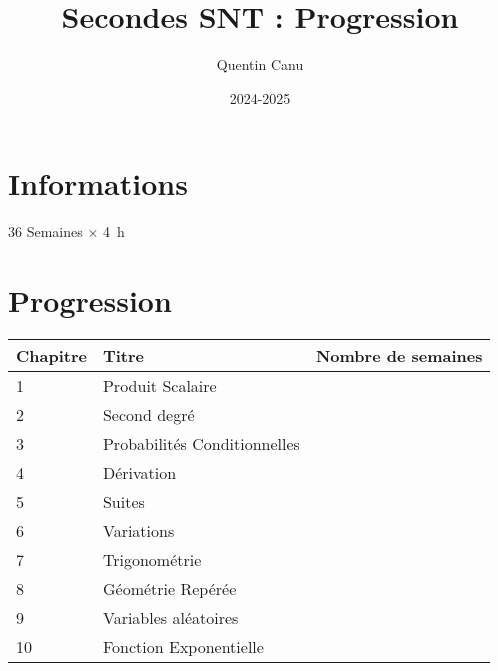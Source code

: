 \documentclass{article}
\title{Secondes SNT : Progression}
\author{Quentin Canu}
\date{2024-2025}
\begin{document}
\maketitle

\section{Informations}

36 Semaines $\times$ \qty{4}{\hour}

\section{Progression}

\begin{center}
    
\begin{tabular}{|l|p{4cm}|p{2cm}|}
\hline
Chapitre
    & 
Titre
        & 
Nombre de semaines\\
\hline
1   &
Produit Scalaire
        &
\\
\hline
2   &
Second degré
        &
\\
\hline
3   &
Probabilités Conditionnelles
        &
\\
\hline
4   &
Dérivation
        &
\\
\hline
5   &
Suites
        &
\\
\hline
6   &
Variations
        &
\\
\hline
7   &
Trigonométrie
        &
\\
\hline
8   &
Géométrie Repérée
        &
\\
\hline
9   &
Variables aléatoires
        &
\\
\hline
10  &
Fonction Exponentielle
        &
\\
\hline
\end{tabular}
\end{center}
\end{document}
